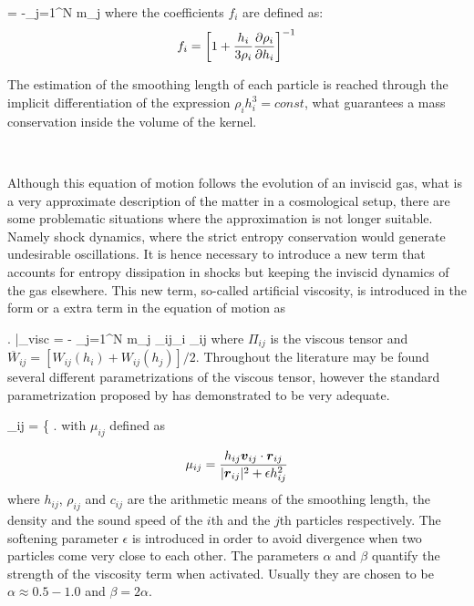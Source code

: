 \documentclass[a4,useAMS,usenatbib,usegraphicx,12pt]{article}
\begin{document}
{ = -\sum_{j=1}^N m_j  }
where the coefficients $f_i$ are defined as:
\[ f_i = \left[  1+\frac{h_i}{3\rho_i}\frac{\partial \rho_i}{\partial h_i}  \right]^{-1} \]

The estimation of the smoothing length of each particle is reached through the
implicit differentiation of the expression $\rho_i h_i^3 = const$, what 
guarantees a mass conservation inside the volume of the kernel.

\

Although this equation of motion follows the evolution of an inviscid gas, what
is a very approximate description of the matter in a cosmological setup, there
are some problematic situations where the approximation is not longer suitable.
Namely shock dynamics, where the strict entropy conservation would generate
undesirable oscillations. It is hence necessary to introduce a new term that 
accounts for entropy dissipation in shocks but keeping the inviscid dynamics of
the gas elsewhere. This new term, so-called artificial viscosity, is introduced 
in the form or a extra term in the equation of motion as

{ \left. \right|_{\mbox{\footnotesize visc}} =
- \sum_{j=1}^N m_j \Pi_{ij}\nabla_i _{ij} }
where $\Pi_{ij}$ is the viscous tensor and $\overline{W}_{ij} = [W_{ij}(h_i)+
W_{ij}(h_j)]/2$. Throughout the literature may be found several different 
parametrizations of the viscous tensor, however the standard parametrization
proposed by \citet{Monaghan83} has demonstrated to be very adequate.

{ \Pi_{ij} = \left\{ \right. }
with $\mu_{ij}$ defined as

\[ \mu_{ij} = \frac{h_{ij}\boldsymbol{ v }_{ij}\cdot \boldsymbol{ r }_{ij}}{|\boldsymbol{ r }_{ij}|^2 + 
\epsilon h_{ij}^2} \]
where $h_{ij}$, $\rho_{ij}$ and $c_{ij}$ are the arithmetic means of the smoothing
length, the density and the sound speed of the $i$th and the $j$th particles 
respectively. The softening parameter $\epsilon$ is introduced in order to avoid
divergence when two particles come very close to each other. The parameters 
$\alpha$ and $\beta$ quantify the strength of the viscosity term when activated.
Usually they are chosen to be $\alpha \approx 0.5-1.0 $ and $\beta=2\alpha$.
\end{document}
